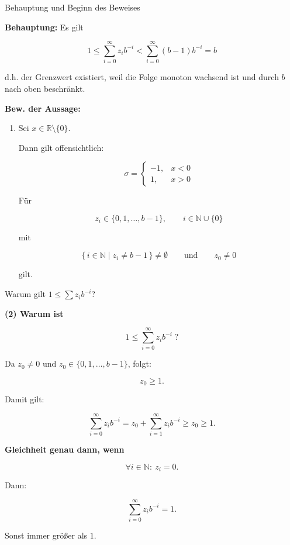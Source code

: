 \documentclass{beamer}
\newcommand{\R}{\mathbb{R}}
\newcommand{\N}{\mathbb{N}}
\begin{document}
\begin{frame}{Behauptung und Beginn des Beweises}

\scriptsize

\textbf{Behauptung:} Es gilt

\[
1 \leq \sum_{i=0}^{\infty} z_i b^{-i}
<
\sum_{i=0}^{\infty}(b-1)b^{-i}
= b
\]

d.h. der Grenzwert existiert, weil die Folge monoton wachsend ist und durch \(b\) nach oben beschränkt.

\vspace{0.35cm}

\textbf{Bew. der Aussage:}

\begin{enumerate}
\item Sei \(x\in\R\setminus\{0\}\).

Dann gilt offensichtlich:

\[
\sigma=
\begin{cases}
-1,& x<0\\[0.2em]
1,& x>0
\end{cases}
\]

Für

\[
z_i\in\{0,1,\dots,b-1\},
\qquad i\in\N\cup\{0\}
\]

mit

\[
\{\,i\in\N \mid z_i\neq b-1\,\}\neq\emptyset
\qquad\text{und}\qquad
z_0\neq 0
\]

gilt.

\end{enumerate}

\end{frame}

\begin{frame}{Warum gilt \(1 \leq \sum z_i b^{-i}\)?}

\scriptsize

\textbf{(2) Warum ist}

\[
1 \leq \sum_{i=0}^{\infty} z_i b^{-i}\; ?
\]

\vspace{0.3cm}

Da \(z_0\neq 0\) und \(z_0\in\{0,1,\dots,b-1\}\), folgt:

\[
z_0\geq 1.
\]

\vspace{0.2cm}

Damit gilt:

\[
\sum_{i=0}^{\infty} z_i b^{-i}
=
z_0+\sum_{i=1}^{\infty} z_i b^{-i}
\geq z_0\geq 1.
\]

\vspace{0.3cm}

\textbf{Gleichheit genau dann, wenn}

\[
\forall i\in\N:\ z_i=0.
\]

Dann:

\[
\sum_{i=0}^{\infty} z_i b^{-i}=1.
\]

\vspace{0.2cm}

Sonst immer größer als \(1\).

\end{frame}
\end{document}
